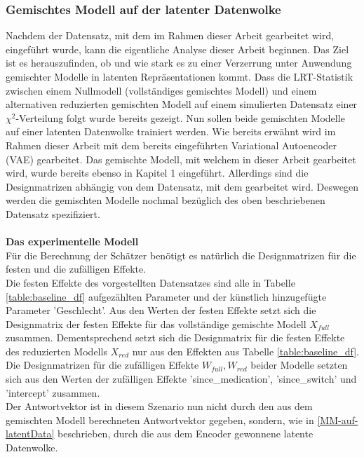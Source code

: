 \documentclass[%
thesis=student,%
coverpage=false,%
titlepage=false,%
headmarks=true, %
german,%
font=libertine, %
math=newpxtx, %
BCOR=5mm,%
coverBCOR=11mm%
]{tumbook}
\theoremstyle{break}
\begin{document}
\subsubsection{Gemischtes Modell auf der latenter Datenwolke}
Nachdem der Datensatz, mit dem im Rahmen dieser Arbeit gearbeitet wird, eingeführt wurde, kann die eigentliche Analyse dieser Arbeit beginnen. Das Ziel ist es herauszufinden, ob und wie stark es zu einer Verzerrung unter Anwendung gemischter Modelle in latenten Repräsentationen kommt. Dass die LRT-Statistik zwischen einem Nullmodell (vollständiges gemischtes Modell) und einem alternativen reduzierten gemischten Modell auf einem simulierten Datensatz einer $\chi^2$-Verteilung folgt wurde bereits gezeigt. Nun sollen beide gemischten Modelle auf einer latenten Datenwolke trainiert werden. Wie bereits erwähnt wird im Rahmen dieser Arbeit mit dem bereits eingeführten Variational Autoencoder (VAE) gearbeitet. Das gemischte Modell, mit welchem in dieser Arbeit gearbeitet wird, wurde bereits ebenso in Kapitel 1 eingeführt. Allerdings sind die Designmatrizen abhängig von dem Datensatz, mit dem gearbeitet wird. Deswegen werden die gemischten Modelle nochmal bezüglich des oben beschriebenen Datensatz spezifiziert.\\
\\
\textbf{Das experimentelle Modell}\\
Für die Berechnung der Schätzer benötigt es natürlich die Designmatrizen für die festen und die zufälligen Effekte. \\
Die festen Effekte des vorgestellten Datensatzes sind alle in Tabelle \ref{table:baseline_df} aufgezählten Parameter und der künstlich hinzugefügte Parameter 'Geschlecht'. Aus den Werten der festen Effekte setzt sich die Designmatrix der festen Effekte für das vollständige gemischte Modell $X_{full}$ zusammen. Dementsprechend setzt sich die Designmatrix für die festen Effekte des reduzierten Modells $X_{red}$ nur aus den Effekten aus Tabelle \ref{table:baseline_df}.\\
Die Designmatrizen für die zufälligen Effekte $W_{full}, W_{red}$ beider Modelle setzten sich aus den Werten der zufälligen Effekte 'since\_medication', 'since\_switch' und 'intercept' zusammen.\\ 
Der Antwortvektor ist in diesem Szenario nun nicht durch den aus dem gemischten Modell berechneten Antwortvektor gegeben, sondern, wie in \ref{MM-auf-latentData} beschrieben, durch die aus dem Encoder gewonnene latente Datenwolke.\\
\\
\end{document}
